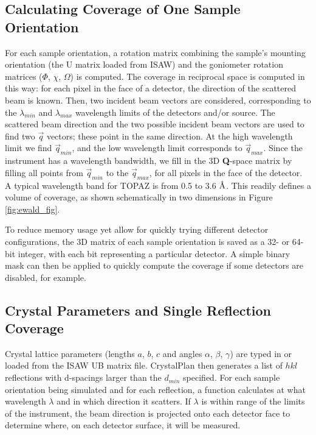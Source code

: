 \documentclass[final]{iucr}              %
\newcommand{\ang}{$\mathrm{\AA} $}
\begin{document}
\subsection{Calculating Coverage of One Sample Orientation}

For each sample orientation, a rotation matrix combining the sample's mounting
orientation (the U matrix loaded from ISAW) and the goniometer rotation matrices
($\Phi$, $\chi$, $\Omega$) is computed. The coverage in reciprocal space is
computed in this way: for each pixel in the face of a detector, the direction of
the scattered beam is known. Then, two incident beam vectors are considered,
corresponding to the $\lambda_{min}$ and $\lambda_{max}$ wavelength limits
of the detectors and/or source. The scattered beam direction and the two possible incident beam vectors
are used to find two $\overrightarrow q$ vectors; these point in the
same direction. At the high wavelength limit we find $\overrightarrow q_{min}$,
and the low wavelength limit corresponds to $\overrightarrow
q_{max}$. Since the instrument has a wavelength bandwidth, we fill in the 3D {\bf Q}-space
matrix by filling all points from $\overrightarrow q_{min}$ to the 
$\overrightarrow q_{max}$, for all pixels in the face of the detector.
A typical wavelength band for TOPAZ is from 0.5 to 3.6 \ang.
This readily defines a volume of coverage, as shown schematically in
two dimensions in Figure \ref{fig:ewald_fig}.


To reduce memory usage yet allow for quickly trying different detector
configurations, the 3D matrix of each sample orientation is saved as a 32- or
64-bit integer, with each bit representing a particular detector. A simple
binary mask can then be applied to quickly compute the coverage if some
detectors are disabled, for example.          




\subsection{Crystal Parameters and Single Reflection Coverage}

Crystal lattice parameters (lengths $a$, $b$, $c$ and angles $\alpha$, $\beta$,
$\gamma$) are typed in or loaded from the ISAW UB matrix file. CrystalPlan then
generates a list of $hkl$ reflections with d-spacings larger than the $d_{min}$
specified. For each sample orientation being simulated and for each reflection, a function calculates at
what wavelength $\lambda$ and in which direction it scatters. If $\lambda$ 
is within range of the limits of the instrument, the beam direction is projected
onto each detector face to determine where, on each detector surface, it will be
measured. 
 
\end{document}
